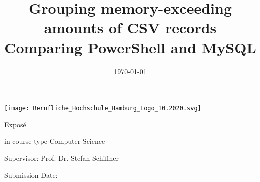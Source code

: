 \begin{center}
    \texttt{[image: Berufliche\_Hochschule\_Hamburg\_Logo\_10.2020.svg]}
\end{center}

\vspace*{10mm}
\begin{center}
\end{center}
\vspace*{10mm}

\title{Grouping memory-exceeding amounts of CSV records\\ \vspace{0,1cm} \large Comparing PowerShell and MySQL}
\date{\vspace{-3ex}}
{\let\newpage\relax\maketitle}
\thispagestyle{empty}

\begin{center}
\begin{large}
\begin{Large}
Exposé\\
\end{Large}
in course type Computer Science \\
\end{large}
\vspace{0.5cm}

\end{center}
\vspace{1cm}
\begin{center}
\begin{large}
Supervisor: Prof. Dr. Stefan Schiffner\\
\end{large}
\end{center}
\begin{center}
\begin{large}
\end{large}
\end{center}

\begin{center}
\begin{large}
Submission Date: \date{\today} \\
\end{large}
\end{center}

\vspace{1,5cm}
